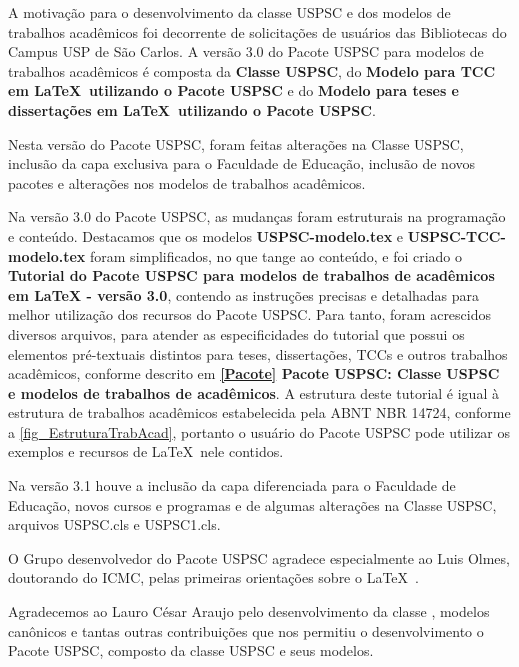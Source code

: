 \begin{agradecimentos}
	A motiva\c{c}\~ao para o desenvolvimento da classe USPSC e dos modelos de trabalhos acad\^emicos foi decorrente de solicita\c{c}\~oes de usu\'arios das Bibliotecas do Campus USP de S\~ao Carlos. A vers\~ao 3.0 do Pacote USPSC para modelos de trabalhos acad\^emicos \'e composta da \textbf{Classe USPSC}, do \textbf{Modelo para TCC em \LaTeX\ utilizando o Pacote USPSC} e do \textbf{Modelo para teses e disserta\c{c}\~oes em \LaTeX\ utilizando o Pacote USPSC}.
	
	Nesta vers\~ao do Pacote USPSC, foram feitas altera\c{c}\~oes na Classe USPSC, inclus\~ao da capa exclusiva para o Faculdade de Educa\c{c}\~ao, inclus\~ao de novos pacotes e altera\c{c}\~oes nos modelos de trabalhos acad\^emicos.
	
	Na vers\~ao 3.0 do Pacote USPSC, as mudan\c{c}as foram estruturais na programa\c{c}\~ao e conte\'udo. Destacamos que os modelos \textbf{USPSC-modelo.tex} e \textbf{USPSC-TCC-modelo.tex} foram simplificados, no que tange ao conte\'udo, e foi criado o \textbf{Tutorial do Pacote USPSC para modelos de trabalhos de acad\^emicos em LaTeX - vers\~ao 3.0}, contendo as instru\c{c}\~oes precisas e detalhadas para melhor utiliza\c{c}\~ao dos recursos do Pacote USPSC. Para tanto, foram acrescidos diversos arquivos, para atender as especificidades do tutorial que possui os elementos pr\'e-textuais distintos para teses, disserta\c{c}\~oes, TCCs e outros trabalhos acad\^emicos, conforme descrito em  \textbf{\ref{Pacote} Pacote USPSC: Classe USPSC e modelos de trabalhos de acad\^emicos}. A estrutura deste tutorial \'e igual \`a  estrutura de trabalhos acad\^emicos estabelecida pela ABNT NBR 14724, conforme a \autoref{fig_EstruturaTrabAcad}, portanto o usu\'ario do Pacote USPSC pode utilizar os exemplos e recursos de \LaTeX\ nele contidos.	
	 
	Na vers\~ao 3.1 houve a inclus\~ao da capa diferenciada para o Faculdade de Educa\c{c}\~ao, novos cursos e programas e de algumas altera\c{c}\~oes na Classe USPSC, arquivos USPSC.cls e  USPSC1.cls.
	
	O Grupo desenvolvedor do Pacote USPSC agradece especialmente ao Luis Olmes, doutorando do ICMC, pelas primeiras orienta\c{c}\~oes sobre o \LaTeX\ . 
	
	Agradecemos ao Lauro C\'esar Araujo pelo desenvolvimento da classe  \abnTeX, modelos can\^onicos e tantas outras contribui\c{c}\~oes que nos permitiu o desenvolvimento o Pacote USPSC, composto da classe USPSC e seus modelos.
	

\end{agradecimentos}
